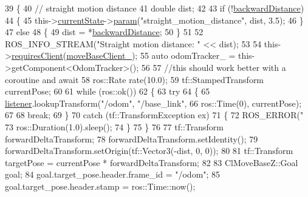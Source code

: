 \begin{DoxyCode}
39     \{
40         \textcolor{comment}{// straight motion distance}
41         \textcolor{keywordtype}{double} dist;
42 
43         \textcolor{keywordflow}{if} (!\hyperlink{classmove__base__z__client_1_1CbNavigateBackwards_a53d06922eff285e4d35f4d7b1b7b7752}{backwardDistance})
44         \{
45             this->\hyperlink{classsmacc_1_1SmaccClientBehavior_af76fc9b877542ed5caf033f820c107d0}{currentState}->\hyperlink{classsmacc_1_1ISmaccState_a4982f2187ed6da337462721146e8ef70}{param}(\textcolor{stringliteral}{"straight\_motion\_distance"}, dist, 3.5);
46         \}
47         \textcolor{keywordflow}{else}
48         \{
49             dist = *\hyperlink{classmove__base__z__client_1_1CbNavigateBackwards_a53d06922eff285e4d35f4d7b1b7b7752}{backwardDistance};
50         \}
51 
52         ROS\_INFO\_STREAM(\textcolor{stringliteral}{"Straight motion distance: "} << dist);
53 
54         this->\hyperlink{classsmacc_1_1SmaccClientBehavior_a917f001e763a1059af337bf4e164f542}{requiresClient}(\hyperlink{classmove__base__z__client_1_1CbNavigateBackwards_ac94348112821680532527fa006651a6c}{moveBaseClient\_});
55         \textcolor{keyword}{auto} odomTracker\_ = this->getComponent<OdomTracker>();
56         
57         \textcolor{comment}{//this should work better with a coroutine and await}
58         ros::Rate rate(10.0);
59         tf::StampedTransform currentPose;
60 
61         \textcolor{keywordflow}{while} (ros::ok())
62         \{
63             \textcolor{keywordflow}{try}
64             \{
65                 \hyperlink{classmove__base__z__client_1_1CbNavigateBackwards_a13939ba95a738b73e0e26f215791d675}{listener}.lookupTransform(\textcolor{stringliteral}{"/odom"}, \textcolor{stringliteral}{"/base\_link"},
66                                          ros::Time(0), currentPose);
67 
68                 \textcolor{keywordflow}{break};
69             \}
70             \textcolor{keywordflow}{catch} (tf::TransformException ex)
71             \{
72                 ROS\_ERROR(\textcolor{stringliteral}{"%
73                 ros::Duration(1.0).sleep();
74             \}
75         \}
76 
77         tf::Transform forwardDeltaTransform;
78         forwardDeltaTransform.setIdentity();
79         forwardDeltaTransform.setOrigin(tf::Vector3(-dist, 0, 0));
80 
81         tf::Transform targetPose = currentPose * forwardDeltaTransform;
82 
83         ClMoveBaseZ::Goal goal;
84         goal.target\_pose.header.frame\_id = \textcolor{stringliteral}{"/odom"};
85         goal.target\_pose.header.stamp = ros::Time::now();
}
\end{DoxyCode}
